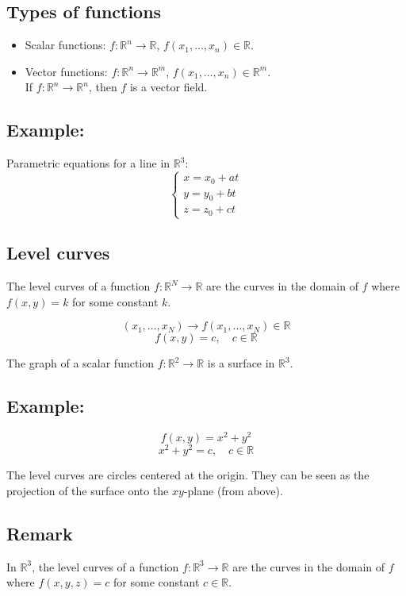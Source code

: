 \documentclass[11pt]{article}
\begin{document}
\subsection{Types of functions}
\begin{itemize}
    \item Scalar functions: $f : \mathbb{R}^n \rightarrow \mathbb{R}$, \quad $f(x_1, \dots , x_n) \in \mathbb{R}$.
    \item Vector functions: $f : \mathbb{R}^n \rightarrow \mathbb{R}^m$, \quad $f(x_1, \dots , x_n) \in \mathbb{R}^m$. \\
                         If $f : \mathbb{R}^n \rightarrow \mathbb{R}^n$, then $f$ is a vector field.
\end{itemize}

\subsection*{Example:}
Parametric equations for a line in $\mathbb{R}^3$:
\[
\begin{cases}
x = x_0 + at \\
y = y_0 + bt \\
z = z_0 + ct
\end{cases}
\]

\subsection{Level curves}
The level curves of a function $f : \mathbb{R}^N \rightarrow \mathbb{R}$ are the curves in the domain of $f$ where $f(x,y) = k$ for some constant $k$.

\[
(x_1, \dots , x_N) \rightarrow f(x_1, \dots , x_N) \in \mathbb{R}
\]
\[
f(x,y) = c, \quad c \in \mathbb{R}
\]

The graph of a scalar function $f : \mathbb{R}^2 \rightarrow \mathbb{R}$ is a surface in $\mathbb{R}^3$.

\subsection*{Example:}
\[
f(x,y) = x^2 + y^2
\]
\[
x^2 + y^2 = c, \quad c \in \mathbb{R}
\]

The level curves are circles centered at the origin.
They can be seen as the projection of the surface onto the $xy$-plane (from above).

\subsection{Remark}
In $\mathbb{R}^3$, the level curves of a function $f : \mathbb{R}^3 \rightarrow \mathbb{R}$ are the curves in the domain of $f$ where $f(x,y,z) = c$ for some constant $c \in \mathbb{R}$.
\end{document}
